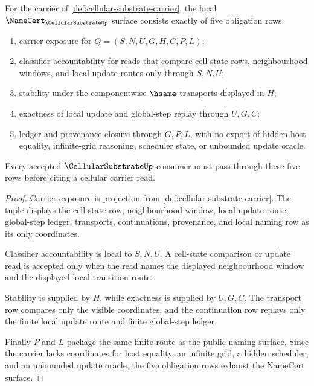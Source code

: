 \begin{theorem}
\label{thm:cellular-substrate-namecert-obligations}
For the carrier of \autoref{def:cellular-substrate-carrier}, the local $\NameCert_{\CellularSubstrateUp}$ surface consists exactly of five obligation rows:
\begin{enumerate}
\item carrier exposure for $Q=(S,N,U,G,H,C,P,L)$;
\item classifier accountability for reads that compare cell-state rows, neighbourhood windows, and local update routes only through $S,N,U$;
\item stability under the componentwise $\hsame$ transports displayed in $H$;
\item exactness of local update and global-step replay through $U,G,C$;
\item ledger and provenance closure through $G,P,L$, with no export of hidden host equality, infinite-grid reasoning, scheduler state, or unbounded update oracle.
\end{enumerate}
Every accepted $\CellularSubstrateUp$ consumer must pass through these five rows before citing a cellular carrier read.
\end{theorem}
\begin{proof}
Carrier exposure is projection from \autoref{def:cellular-substrate-carrier}. The tuple displays the cell-state row, neighbourhood window, local update route, global-step ledger, transports, continuations, provenance, and local naming row as its only coordinates.

Classifier accountability is local to $S,N,U$. A cell-state comparison or update read is accepted only when the read names the displayed neighbourhood window and the displayed local transition route.

Stability is supplied by $H$, while exactness is supplied by $U,G,C$. The transport row compares only the visible coordinates, and the continuation row replays only the finite local update route and finite global-step ledger.

Finally $P$ and $L$ package the same finite route as the public naming surface. Since the carrier lacks coordinates for host equality, an infinite grid, a hidden scheduler, and an unbounded update oracle, the five obligation rows exhaust the NameCert surface.
\end{proof}

